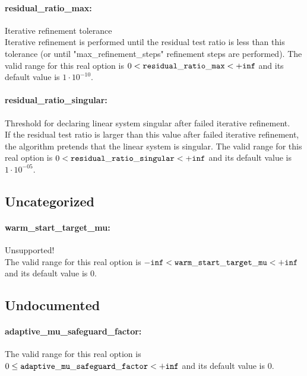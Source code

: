 \paragraph{residual\_ratio\_max:}\label{sec:residual_ratio_max} Iterative refinement tolerance $\;$ \\
 Iterative refinement is performed until the
residual test ratio is less than this tolerance
(or until "max\_refinement\_steps" refinement
steps are performed). The valid range for this real option is 
$0 <  {\tt residual\_ratio\_max } <  {\tt +inf}$
and its default value is $1 \cdot 10^{-10}$.


\paragraph{residual\_ratio\_singular:}\label{sec:residual_ratio_singular} Threshold for declaring linear system singular after failed iterative refinement. $\;$ \\
 If the residual test ratio is larger than this
value after failed iterative refinement, the
algorithm pretends that the linear system is
singular. The valid range for this real option is 
$0 <  {\tt residual\_ratio\_singular } <  {\tt +inf}$
and its default value is $1 \cdot 10^{-05}$.


\subsection{Uncategorized}
\label{sec:Uncategorized}
\paragraph{warm\_start\_target\_mu:}\label{sec:warm_start_target_mu} Unsupported! $\;$ \\
 The valid range for this real option is 
${\tt -inf} <  {\tt warm\_start\_target\_mu } <  {\tt +inf}$
and its default value is $0$.


\subsection{Undocumented}
\label{sec:Undocumented}
\paragraph{adaptive\_mu\_safeguard\_factor:}\label{sec:adaptive_mu_safeguard_factor}  $\;$ \\
 The valid range for this real option is 
$0 \le {\tt adaptive\_mu\_safeguard\_factor } <  {\tt +inf}$
and its default value is $0$.


